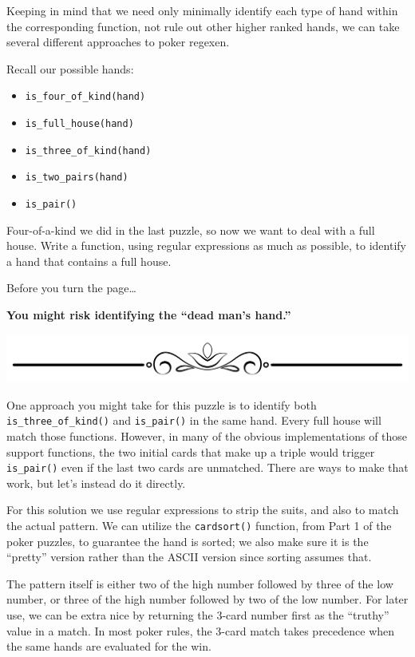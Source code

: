 Keeping in mind that we need only minimally identify each type of hand
within the corresponding function, not rule out other higher ranked
hands, we can take several different approaches to poker regexen.

Recall our possible hands:

\begin{itemize}
\tightlist
\item
  \texttt{is\_four\_of\_kind(hand)}
\item
  \texttt{is\_full\_house(hand)}
\item
  \texttt{is\_three\_of\_kind(hand)}
\item
  \texttt{is\_two\_pairs(hand)}
\item
  \texttt{is\_pair()}
\end{itemize}

Four-of-a-kind we did in the last puzzle, so now we want to deal with a
full house. Write a function, using regular expressions as much as
possible, to identify a hand that contains a full house.

Before you turn the page\ldots{}

\textbf{You might risk identifying the ``dead man's hand.''}

\includegraphics{images/Elegant-Flourish-Frame-Extrapolated-19.svg}

\newpage

One approach you might take for this puzzle is to identify both
\texttt{is\_three\_of\_kind()} and \texttt{is\_pair()} in the same hand.
Every full house will match those functions. However, in many of the
obvious implementations of those support functions, the two initial
cards that make up a triple would trigger \texttt{is\_pair()} even if
the last two cards are unmatched. There are ways to make that work, but
let's instead do it directly.

For this solution we use regular expressions to strip the suits, and
also to match the actual pattern. We can utilize the \texttt{cardsort()}
function, from Part 1 of the poker puzzles, to guarantee the hand is
sorted; we also make sure it is the ``pretty'' version rather than the
ASCII version since sorting assumes that.

The pattern itself is either two of the high number followed by three of
the low number, or three of the high number followed by two of the low
number. For later use, we can be extra nice by returning the 3-card
number first as the ``truthy'' value in a match. In most poker rules,
the 3-card match takes precedence when the same hands are evaluated for
the win.

